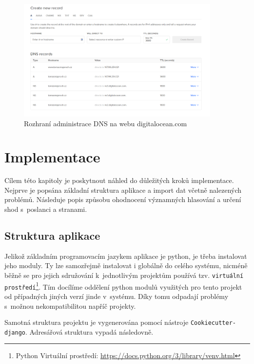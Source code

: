 \begin{figure}
    \centering
    \includegraphics[width=0.9\textwidth]{obrazky-figures/digitaloceanDNSadmin.png}
    \caption{Rozhraní administrace DNS na webu digitalocean.com}
    \label{fig:digitalocean-dns}
\end{figure}


\chapter{Implementace}
\label{chap:implementace}
Cílem této kapitoly je poskytnout náhled do důležitých kroků implementace. Nejprve je popsána základní struktura aplikace a import dat včetně nalezených problémů. Následuje popis způsobu ohodnocení významných hlasování a určení shod s~poslanci a stranami.

\section{Struktura aplikace}
Jelikož základním programovacím jazykem aplikace je python, je třeba instalovat jeho moduly. Ty lze samozřejmě instalovat i globálně do celého systému, nicméně běžně se pro jejich sdružování k~jednotlivým projektům používá tzv. \texttt{virtuální prostředí}\footnote{Python Virtuální prostředí: \url{https://docs.python.org/3/library/venv.html}}. Tím docílíme oddělení python modulů využitých pro tento projekt od případných jiných verzí jinde v~systému. Díky tomu odpadají problémy s~možnou nekompatibilitou napříč projekty. 

\par Samotná struktura projektu je vygenerována pomocí nástroje \texttt{Cookiecutter-django}. Adresářová struktura vypadá následovně.\\



